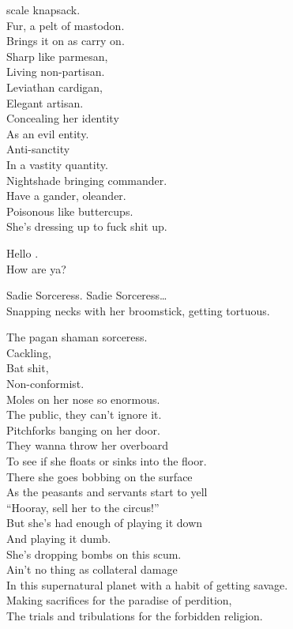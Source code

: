  scale knapsack. \\
Fur, a pelt of mastodon. \\
Brings it on as carry on. \\
Sharp like parmesan, \\
Living non-partisan. \\
Leviathan cardigan, \\
Elegant artisan. \\
Concealing her identity \\
As an evil entity. \\
Anti-sanctity \\
In a vastity quantity. \\
Nightshade bringing  commander. \\
Have a gander, oleander. \\
Poisonous like buttercups. \\
She's dressing up to fuck shit up. \\


Hello . \\
How are ya? \\


Sadie Sorceress. Sadie Sorceress… \\
Snapping necks with her broomstick, getting tortuous. \\


The pagan shaman sorceress. \\
Cackling, \\
Bat shit, \\
Non-conformist. \\
Moles on her nose so enormous. \\
The public, they can't ignore it. \\
Pitchforks banging on her door. \\
They wanna throw her overboard \\
To see if she floats or sinks into the floor. \\
There she goes bobbing on the surface \\
As the peasants and servants start to yell \\
``Hooray, sell her to the circus!'' \\
But she's had enough of playing it down \\
And playing it dumb. \\
She's dropping bombs on this  scum. \\
Ain't no thing as collateral damage \\
In this supernatural planet with a habit of getting savage. \\
Making sacrifices for the paradise of perdition, \\
The trials and tribulations for the forbidden religion. \\

